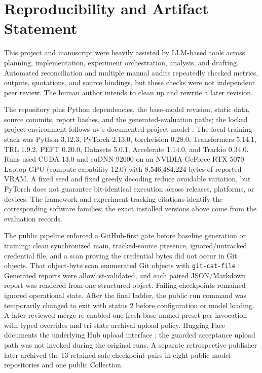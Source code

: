 \section{Reproducibility and Artifact Statement}

This project and manuscript were heavily assisted by LLM-based tools across
planning, implementation, experiment orchestration, analysis, and drafting.
Automated reconciliation and multiple manual audits repeatedly checked metrics,
outputs, quotations, and source bindings, but these checks were not independent
peer review. The human author intends to clean up and rewrite a later revision.

The repository pins Python dependencies, the base-model revision, static data,
source commits, report hashes, and the generated-evaluation paths; the locked
project environment follows uv's documented project model \citep{uv}. The local
training stack was Python 3.12.3, PyTorch 2.13.0, torchvision 0.28.0,
Transformers 5.14.1, TRL 1.9.2, PEFT 0.20.0, Datasets 5.0.1, Accelerate 1.14.0,
and Trackio 0.34.0. Runs used CUDA 13.0 and cuDNN 92000 on an NVIDIA GeForce RTX
5070 Laptop GPU (compute capability 12.0) with 8,546,484,224 bytes of reported
VRAM. A fixed seed and fixed greedy decoding reduce avoidable variation, but
PyTorch does not guarantee bit-identical execution across releases, platforms,
or devices. \citep{transformersgeneration,pytorchreproducibility}
The framework and experiment-tracking citations identify the corresponding
software families; the exact installed versions above come from the evaluation
records. \citep{paszke2019pytorch,wolf2020transformers,vonwerra2020trl,
mangrulkar2022peft,trackio}

The public pipeline enforced a GitHub-first gate before baseline generation or
training: clean synchronized main, tracked-source presence, ignored/untracked
credential file, and a scan proving the credential bytes did not occur in Git
objects. That object-byte scan enumerated Git objects with
\texttt{git-cat-file} \citep{gitcatfile}. Generated reports were
allowlist-validated, and each paired JSON/Markdown report was rendered from one
structured object. Failing checkpoints remained ignored operational state.
After the final ladder, the public run command was temporarily changed to exit
with status 2 before configuration or model loading. A later reviewed merge
re-enabled one fresh-base named preset per invocation with typed overrides and
tri-state archival upload policy. Hugging Face documents the underlying Hub
upload interface \citep{huggingfacehub}; the guarded acceptance upload path was
not invoked during the original runs. A separate retrospective publisher later
archived the 13 retained safe checkpoint pairs in eight public model
repositories and one public Collection.
%

